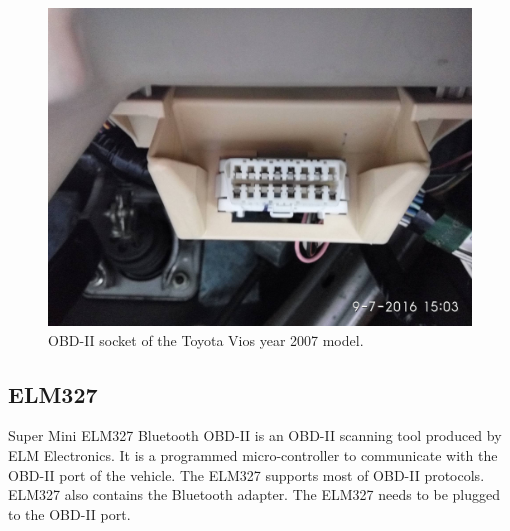 \begin{figure}[hbt!]\centering
\includegraphics[width=.75\textwidth]{image/obd}
\caption{OBD-II socket of the Toyota Vios year 2007 model.}
\label{fig:obd}
\end{figure}

\subsection{ELM327}
Super Mini ELM327 Bluetooth OBD-II is an OBD-II scanning tool produced by ELM Electronics. It is a programmed micro-controller to communicate with the OBD-II port of the vehicle. The ELM327 supports most of OBD-II protocols. ELM327 also contains the Bluetooth adapter. The ELM327 needs to be plugged to the OBD-II port.

